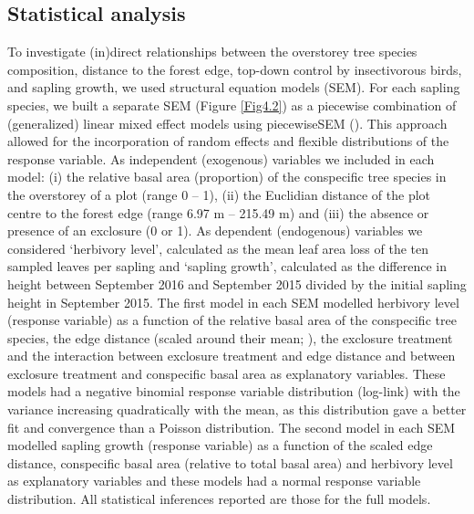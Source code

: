 \documentclass[b5paper,10pt]{book} %
\begin{document}
	\subsection{Statistical analysis}

	To investigate (in)direct relationships between the overstorey tree species composition, distance to the forest edge, top-down control by insectivorous birds, and sapling growth, we used structural equation models (SEM). For each sapling species, we built a separate SEM (Figure \ref{Fig4.2}) as a piecewise combination of (generalized) linear mixed effect models using piecewiseSEM (\citealt{Lefcheck2016}). This approach allowed for the incorporation of random effects and flexible distributions of the response variable. As independent (exogenous) variables we included in each model: (i) the relative basal area (proportion) of the conspecific tree species in the overstorey of a plot (range 0 -- 1), (ii) the Euclidian distance of the plot centre to the forest edge (range 6.97 m -- 215.49 m) and (iii) the absence or presence of an exclosure (0 or 1). As dependent (endogenous) variables we considered ‘herbivory level’, calculated as the mean leaf area loss of the ten sampled leaves per sapling and ‘sapling growth’, calculated as the difference in height between September 2016 and September 2015 divided by the initial sapling height in September 2015. The first model in each SEM modelled herbivory level (response variable) as a function of the relative basal area of the conspecific tree species, the edge distance (scaled around their mean; \citealt{Schielzeth2010}), the exclosure treatment and the interaction between exclosure treatment and edge distance and between exclosure treatment and conspecific basal area as explanatory variables. These models had a negative binomial response variable distribution (log-link) with the variance increasing quadratically with the mean, as this distribution gave a better fit and convergence than a Poisson distribution. The second model in each SEM modelled sapling growth (response variable) as a function of the scaled edge distance, conspecific basal area (relative to total basal area) and herbivory level as explanatory variables and these models had a normal response variable distribution. All statistical inferences reported are those for the full models.
\end{document}
